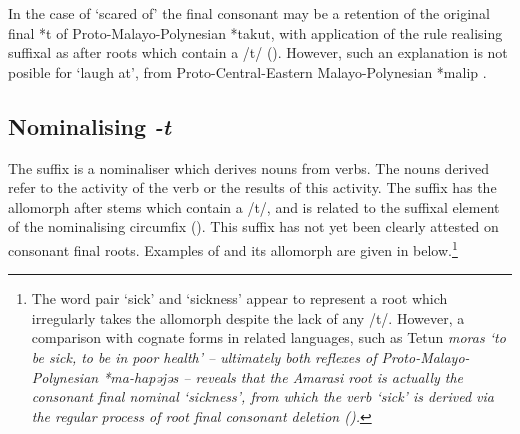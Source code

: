 In the case of  `scared of' the final consonant
may be a retention of the original final *t of Proto-Malayo-Polynesian *takut,
with application of the rule realising suffixal  as 
after roots which contain a /t/ ().
However, such an explanation is not posible for  `laugh at',
from Proto-Central-Eastern Malayo-Polynesian *malip \citep{bltr}.

\subsection{Nominalising \it{-t}}\label{sec:Nom-t}
The suffix  is a nominaliser which derives nouns from verbs.
The nouns derived refer to the activity of the verb or the results of this activity.
The suffix  has the allomorph  after stems which contain a /t/,
and is related to the suffixal element of
the nominalising circumfix  ().
This suffix has not yet been clearly attested on consonant final roots.
Examples of  and its allomorph  are given in  below.\footnote{
		The word pair  `sick' and  `sickness' appear to represent
		a root which irregularly takes the allomorph  despite the lack of any /t/.
		However, a comparison with cognate forms in related languages,
		such as Tetun \it{moras} `to be sick, to be in poor health' \citep[143]{mo84}
		-- ultimately both reflexes of Proto-Malayo-Polynesian *ma-hapəjəs --
		reveals that the Amarasi root is actually the consonant final nominal  `sickness',
		from which the verb  `sick' is derived via the regular process
		of root final consonant deletion ().}

